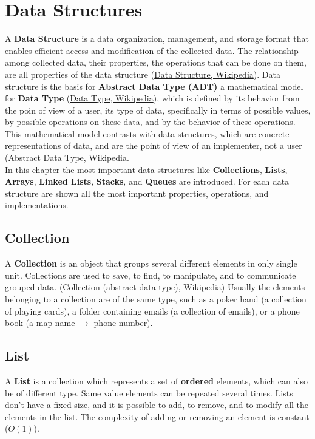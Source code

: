 \setchapterpreamble[u]{\margintoc}
\chapter{Data Structures}
A \textbf{Data Structure} is a data organization, management, and storage format that enables efficient access and modification of the collected data. The relationship among collected data, their properties, the operations that can be done on them, are all properties of the data structure \cite{wikidatastructure} (\href{https://en.wikipedia.org/wiki/Data_structure}{Data Structure, Wikipedia}). Data structure is the basis for \textbf{Abstract Data Type (ADT)} a mathematical model for \textbf{Data Type} \cite{wikidatatype} (\href{https://en.wikipedia.org/wiki/Data_type}{Data Type, Wikipedia}), which is defined by its behavior from the poin of view of a user, its type of data, specifically in terms of possible values, by possible operations on these data, and by the behavior of these operations. This mathematical model contrasts with data structures, which are concrete representations of data, and are the point of view of an implementer, not a user \cite{wikiabstractdatatype} (\href{https://en.wikipedia.org/wiki/Abstract_data_type}{Abstract Data Type, Wikipedia}.
\\
In this chapter the most important data structures like \textbf{Collections}, \textbf{Lists}, \textbf{Arrays}, \textbf{Linked Lists}, \textbf{Stacks}, and \textbf{Queues} are introduced. For each data structure are shown all the most important properties, operations, and implementations.
\section{Collection}
A \textbf{Collection} is an object that groups several different elements in only single unit. Collections are used to save, to find, to manipulate, and to communicate grouped data. \cite{wikicollection} (\href{https://en.wikipedia.org/wiki/Collection_(abstract_data_type)}{Collection (abstract data type), Wikipedia}) Usually the elements belonging to a collection are of the same type, such as a poker hand (a collection of playing cards), a folder containing emails (a collection of emails), or a phone book (a map name \(\rightarrow\) phone number).
\section{List}
A \textbf{List} is a collection which represents a set of \textbf{ordered} elements, which can also be of different type. Same value elements can be repeated several times. Lists don't have a fixed size, and it is possible to add, to remove, and to modify all the elements in the list. The complexity of adding or removing an element is constant (\(O(1)\)).
